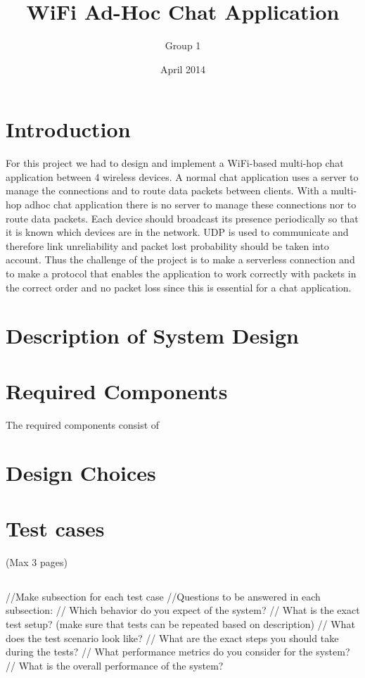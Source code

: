 \documentclass{report}
\title{WiFi Ad-Hoc Chat Application}
\author{Group 1}
\date{April 2014}
\begin{document}
\maketitle

\tableofcontents

\section{Introduction}
For this project we had to design and implement a WiFi-based multi-hop chat application between 4 wireless devices. A normal chat application uses a server to manage the connections and to route data packets between clients. With a multi-hop adhoc chat  application there is no server to manage these connections nor to route data packets. Each device should broadcast its presence periodically so that it is known which devices are in the network. UDP is used to communicate and therefore link unreliability and packet lost probability should be taken into account. Thus the challenge of the project is to make a serverless connection and to make a protocol that enables the application to work correctly with packets in the correct order and no packet loss since this is essential for a chat application.

\section{Description of System Design}

\section{Required Components}
The required components consist of

\section{Design Choices}

\section{Test cases} (Max 3 pages)
\subsection{} //Make subsection for each test case
//Questions to be answered in each subsection:
// Which behavior do you expect of the system?
// What is the exact test setup? (make sure that tests can be repeated based on description)
// What does the test scenario look like?
// What are the exact steps you should take during the tests?
// What performance metrics do you consider for the system?
// What is the overall performance of the system?
\end{document}
